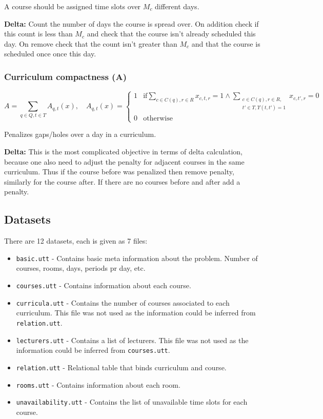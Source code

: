 A course should be assigned time slots over $M_c$ different days.

\textbf{Delta: } Count the number of days the course is spread over. On addition check if this count is less than $M_c$ and check that the course isn't already scheduled this day. On remove check that the count isn't greater than $M_c$ and that the course is scheduled once once this day.

\subsubsection{Curriculum compactness (A)}
\begin{equation*}
A = \sum_{q \in Q, t \in T} A_{q, t}(x), \quad A_{q, t}(x) = \begin{cases}
1 & \text{if} \displaystyle \sum_{c \in C(q), r \in R} x_{c, t, r} = 1 \wedge \sum_{\substack{c \in C(q), r \in R,\\ t' \in T, \Upsilon(t, t')  = 1}} x_{c, t', r} = 0 \\
0 & \text{otherwise}
\end{cases}
\end{equation*}

Penalizes gaps/holes over a day in a curriculum.

\textbf{Delta: } This is the most complicated objective in terms of delta calculation, because one also need to adjust the penalty for adjacent courses in the same curriculum. Thus if the course before was penalized then remove penalty, similarly for the course after. If there are no courses before and after add a penalty.

\subsection{Datasets}

There are 12 datasets, each is given as 7 files:
\begin{itemize}
\item \texttt{basic.utt} - Contains basic meta information about the problem. Number of courses, rooms, days, periods pr day, etc.
\item \texttt{courses.utt} - Contains information about each course.
\item \texttt{curricula.utt} - Contains the number of courses associated to each curriculum. This file was not used as the information could be inferred from \texttt{relation.utt}.
\item \texttt{lecturers.utt} - Contains a list of lecturers. This file was not used as the information could be inferred from \texttt{courses.utt}.
\item \texttt{relation.utt} - Relational table that binds curriculum and course.
\item \texttt{rooms.utt} - Contains information about each room.
\item \texttt{unavailability.utt} - Contains the list of unavailable time slots for each course.
\end{itemize}

